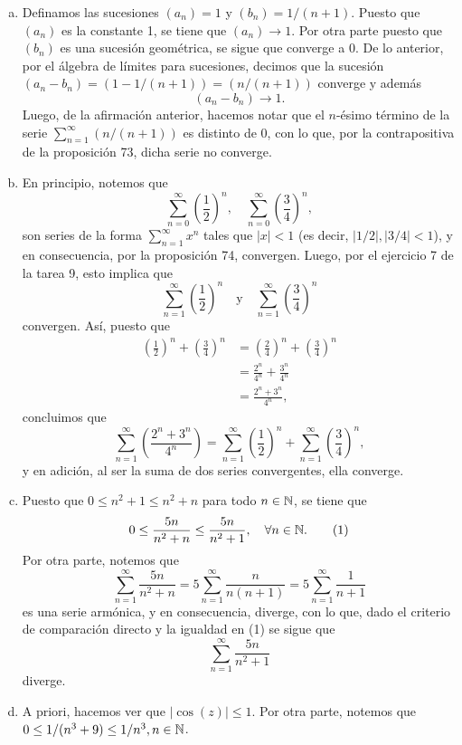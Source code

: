 \documentclass[11pt]{scrartcl}
\begin{document}
\begin{enumerate}[(a)]
    \item Definamos las sucesiones $(a_n)=1$ y $(b_n)=1/(n+1)$. Puesto que $(a_n)$ es la constante 1,
    se tiene que $(a_n)\rightarrow 1$. Por otra parte puesto que $(b_n)$ es una sucesión geométrica, se sigue que converge
    a 0. De lo anterior, por el álgebra de límites para sucesiones, decimos que la sucesión $(a_n-b_n)=(1-1/(n+1))=(n/(n+1))$
    converge y además
    \[
    (a_n-b_n) \rightarrow 1.
    \]
    Luego, de la afirmación anterior, hacemos notar que el $n$-ésimo término de la serie $\sum_{n=1}^{\infty}(n/(n+1))$ es distinto de 0,
    con lo que, por la contrapositiva de la proposición 73, dicha serie no converge.
    \item En principio, notemos que
    \[
    \sum_{n=0}^{\infty}\left(\frac{1}{2}\right)^n, \quad \sum_{n=0}^{\infty}\left(\frac{3}{4}\right)^n,
    \]
    son series de la forma $\sum_{n=1}^{\infty}x^n$ tales que $|x|<1$ (es decir, $|1/2|,|3/4|<1$), y en consecuencia, por la proposición 74,
    convergen. Luego, por el ejercicio 7 de la tarea 9, esto implica que
    \[
    \sum_{n=1}^{\infty}\left(\frac{1}{2}\right)^n \quad \text{y} \quad \sum_{n=1}^{\infty}\left(\frac{3}{4}\right)^n
    \]
    convergen. Así, puesto que
    \begin{align*}
        \left(\frac{1}{2}\right)^n + \left(\frac{3}{4}\right)^n &= \left(\frac{2}{4}\right)^n+\left(\frac{3}{4}\right)^n \\
        &= \frac{2^n}{4^n}+\frac{3^n}{4^n} \\
        &= \frac{2^n+3^n}{4^n},
    \end{align*}
    concluimos que
    \[
    \sum_{n=1}^{\infty}\left(\frac{2^n+3^n}{4^n}\right)=\sum_{n=1}^{\infty}\left(\frac{1}{2}\right)^n + \sum_{n=1}^{\infty}\left(\frac{3}{4}\right)^n,
    \]
    y en adición, al ser la suma de dos series convergentes, ella converge.
    \item Puesto que $0 \leq n^2+1 \leq n^2 +n$ para todo $n \in \mathbb N$, se tiene que
    \[
    0 \leq \frac{5n}{n^2+n} \leq \frac{5n}{n^2+1}, \quad \forall n \in \mathbb N. \tag{1}
    \]
    Por otra parte, notemos que
    \[
    \sum_{n=1}^{\infty}\frac{5n}{n^2+n}=5\sum_{n=1}^{\infty}\frac{n}{n(n+1)}=5\sum_{n=1}^{\infty}\frac{1}{n+1}
    \]
    es una serie armónica, y en consecuencia, diverge, con lo que, dado el criterio de comparación directo y la igualdad en (1) se sigue que
    \[
    \sum_{n=1}^{\infty}\frac{5n}{n^2+1}
    \]
    diverge.
    \item A priori, hacemos ver que $|\cos(z)|\leq 1$. Por otra parte, notemos que $0 \leq 1/(n^3+9) \leq 1/n^3, n\in \mathbb N$.

\end{enumerate}
\end{document}
